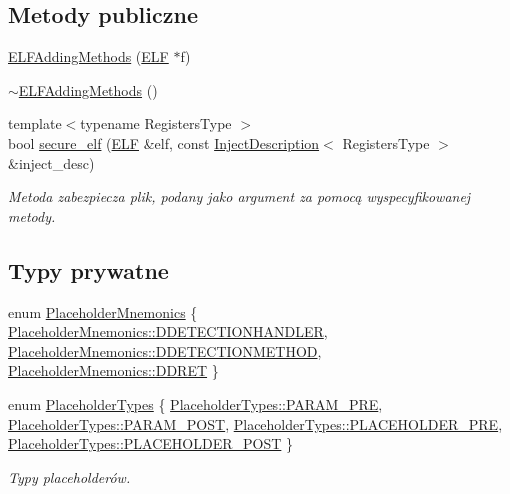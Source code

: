 \subsection*{Metody publiczne}
\begin{DoxyCompactItemize}
\item 
\hyperlink{class_e_l_f_adding_methods_a49ddea5561dbff8a787d586e58d70d22}{E\-L\-F\-Adding\-Methods} (\hyperlink{class_e_l_f}{E\-L\-F} $\ast$f)
\item 
\hyperlink{class_e_l_f_adding_methods_a374088ad2597fa11063b5a19bae0ffec}{$\sim$\-E\-L\-F\-Adding\-Methods} ()
\item 
{\footnotesize template$<$typename Registers\-Type $>$ }\\bool \hyperlink{class_e_l_f_adding_methods_acaa41aa5ab101bb4fa0e23a3029020ad}{secure\-\_\-elf} (\hyperlink{class_e_l_f}{E\-L\-F} \&elf, const \hyperlink{class_d_adding_methods_1_1_inject_description}{Inject\-Description}$<$ Registers\-Type $>$ \&inject\-\_\-desc)
\begin{DoxyCompactList}\small\item\em Metoda zabezpiecza plik, podany jako argument za pomocą wyspecyfikowanej metody. \end{DoxyCompactList}\end{DoxyCompactItemize}
\subsection*{Typy prywatne}
\begin{DoxyCompactItemize}
\item 
enum \hyperlink{class_e_l_f_adding_methods_a666b28eeb9569323a4f697d37c6a1022}{Placeholder\-Mnemonics} \{ \hyperlink{class_e_l_f_adding_methods_a666b28eeb9569323a4f697d37c6a1022aa229d6072e720d4ea51a461305a77419}{Placeholder\-Mnemonics\-::\-D\-D\-E\-T\-E\-C\-T\-I\-O\-N\-H\-A\-N\-D\-L\-E\-R}, 
\hyperlink{class_e_l_f_adding_methods_a666b28eeb9569323a4f697d37c6a1022a27bbeb27ba0c0ff952f0fd2d60ae393d}{Placeholder\-Mnemonics\-::\-D\-D\-E\-T\-E\-C\-T\-I\-O\-N\-M\-E\-T\-H\-O\-D}, 
\hyperlink{class_e_l_f_adding_methods_a666b28eeb9569323a4f697d37c6a1022a5f7c52080f7e0204b8d872cba032e24d}{Placeholder\-Mnemonics\-::\-D\-D\-R\-E\-T}
 \}
\item 
enum \hyperlink{class_e_l_f_adding_methods_a7058ae8ed3ce82783edb1eb0a44c1150}{Placeholder\-Types} \{ \hyperlink{class_e_l_f_adding_methods_a7058ae8ed3ce82783edb1eb0a44c1150a52f564497e8e79fb9faf8ef2e4e727ba}{Placeholder\-Types\-::\-P\-A\-R\-A\-M\-\_\-\-P\-R\-E}, 
\hyperlink{class_e_l_f_adding_methods_a7058ae8ed3ce82783edb1eb0a44c1150a64a5bcb12c5350fc77bead500da05d04}{Placeholder\-Types\-::\-P\-A\-R\-A\-M\-\_\-\-P\-O\-S\-T}, 
\hyperlink{class_e_l_f_adding_methods_a7058ae8ed3ce82783edb1eb0a44c1150a7f3e363cf91446c37876c5842a13ed14}{Placeholder\-Types\-::\-P\-L\-A\-C\-E\-H\-O\-L\-D\-E\-R\-\_\-\-P\-R\-E}, 
\hyperlink{class_e_l_f_adding_methods_a7058ae8ed3ce82783edb1eb0a44c1150ac48d0ec9c86b18c729c51ca6742cbf19}{Placeholder\-Types\-::\-P\-L\-A\-C\-E\-H\-O\-L\-D\-E\-R\-\_\-\-P\-O\-S\-T}
 \}
\begin{DoxyCompactList}\small\item\em Typy placeholderów. \end{DoxyCompactList}\end{DoxyCompactItemize}
